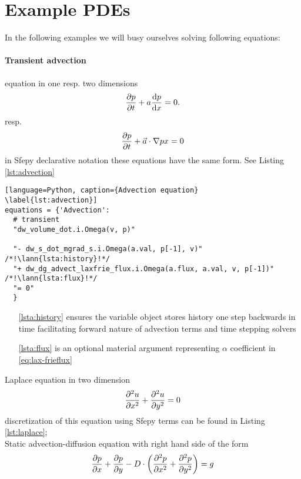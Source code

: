 \section{Example PDEs}
In the following examples we will busy ourselves solving following equations:\\
\paragraph{Transient advection} equation in one resp. two dimensions
\begin{equation}
	\label{eq:ex_advection}
	\frac{\partial p}{\partial t} + a\frac{\text{d}p}{\text{d}x} = 0.
\end{equation}
resp.
\begin{equation}
	\frac{\partial p}{\partial t} + \vec{a}\cdot\nabla{p}{x} = 0
\end{equation}
in Sfepy declarative notation these equations have the same form. See Listing 
\ref{lst:advection}
\setcounter{lstannotation}{0}
\begin{lstlisting}[language=Python, caption={Advection equation}
\label{lst:advection}]
equations = {'Advection': 
  # transient
  "dw_volume_dot.i.Omega(v, p)"
 
  "- dw_s_dot_mgrad_s.i.Omega(a.val, p[-1], v)" /*!\lann{lsta:history}!*/
  "+ dw_dg_advect_laxfrie_flux.i.Omega(a.flux, a.val, v, p[-1])"  /*!\lann{lsta:flux}!*/
  "= 0"
  }
\end{lstlisting}
\begin{itemize}
	\item[\ref{lsta:history}]  ensures the variable object stores 
	history one step backwards in time facilitating forward nature of advection terms and 
	time stepping solvers
	\item[\ref{lsta:flux}]  is an optional material argument 
	representing $\alpha$ coefficient in \eqref{eq:lax-frieflux}
\end{itemize}
Laplace equation in two dimension
\begin{equation}
	\label{eq:ex_laplace}
	\frac{\partial^2 u}{\partial x^2} + \frac{\partial^2 u}{\partial y^2} = 0
\end{equation}
discretization of this equation using Sfepy terms can be found in Listing 
\ref{lst:laplace};\\
Static advection-diffusion equation with right hand side of the form
\begin{equation}
\label{eq:ex_advdiff}
\frac{\partial p}{\partial x} + \frac{\partial p}{\partial y} - D \cdot \left( \frac{\partial^2 p}{\partial x^2} + \frac{\partial^2 
p}{\partial y^2} \right) = g
\end{equation}
